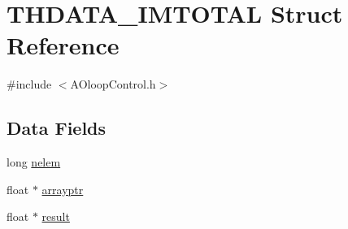 \hypertarget{structTHDATA__IMTOTAL}{\section{T\+H\+D\+A\+T\+A\+\_\+\+I\+M\+T\+O\+T\+A\+L Struct Reference}
\label{structTHDATA__IMTOTAL}
}


{\ttfamily \#include $<$A\+Oloop\+Control.\+h$>$}

\subsection*{Data Fields}
\begin{DoxyCompactItemize}
\item 
long \hyperlink{structTHDATA__IMTOTAL_a76ddea2173c5446db1f3af1494aaf696}{nelem}
\item 
float $\ast$ \hyperlink{structTHDATA__IMTOTAL_ad6cf52b519e71665d6dc23ac14bec80e}{arrayptr}
\item 
float $\ast$ \hyperlink{structTHDATA__IMTOTAL_a9e7c01abf8aad470594aa818ef3335d8}{result}
\end{DoxyCompactItemize}


